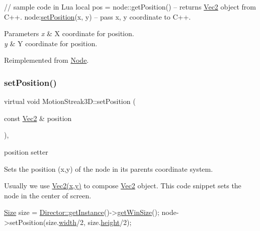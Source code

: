 \begin{DoxyCode}
\textcolor{comment}{// sample code in Lua}
local pos  = node::getPosition()  -- returns \hyperlink{classVec2}{Vec2} \textcolor{keywordtype}{object} from C++.
node:\hyperlink{classMotionStreak3D_a8e4698c3850e094f90600e3ba4604651}{setPosition}(x, y)            -- pass x, y coordinate to C++.
\end{DoxyCode}



\begin{DoxyParams}{Parameters}
{\em x} & X coordinate for position. \\
\hline
{\em y} & Y coordinate for position. \\
\hline
\end{DoxyParams}


Reimplemented from \hyperlink{classNode_aaa8545c103ef1b35e5076dbedab93af5}{Node}.

\mbox{\label{classMotionStreak3D_a070710f82d947115207e9bfc0eeb4d30}} 
\subsubsection{\texorpdfstring{set\+Position()}{setPosition()}\hspace{0.1cm}{\footnotesize\ttfamily [3/4]}}
{\footnotesize\ttfamily virtual void Motion\+Streak3\+D\+::set\+Position (\begin{DoxyParamCaption}\item[{const \hyperlink{classVec2}{Vec2} \&}]{position }\end{DoxyParamCaption})\hspace{0.3cm}{\ttfamily [override]}, {\ttfamily [virtual]}}



position setter 

Sets the position (x,y) of the node in its parent\textquotesingle{}s coordinate system.

Usually we use {\ttfamily \hyperlink{classVec2}{Vec2(x,y)}} to compose \hyperlink{classVec2}{Vec2} object. This code snippet sets the node in the center of screen. 
\begin{DoxyCode}
\hyperlink{classSize}{Size} size = \hyperlink{classDirector_a8d2a4ca9e20cd400ddadd516efa111e0}{Director::getInstance}()->\hyperlink{classDirector_af07668df4a8916e6eb0f79a93f6588fe}{getWinSize}();
node->setPosition(size.\hyperlink{classSize_af0be19024ddd79e7843492b3760c21f0}{width}/2, size.\hyperlink{classSize_a880fa21eaad5a5a0fe439d440776fd05}{height}/2);
\end{DoxyCode}



